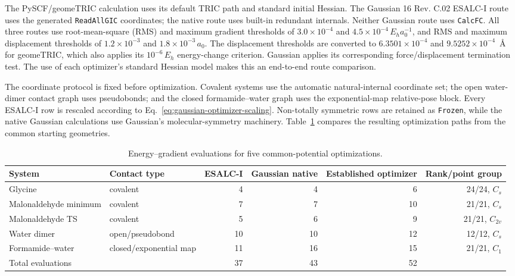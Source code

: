 \documentclass[10pt]{article}
\begin{document}
{The PySCF/geomeTRIC calculation uses its default TRIC path and standard initial
Hessian.  The Gaussian 16 Rev. C.02 ESALC-I route uses the generated
\texttt{ReadAllGIC} coordinates; the native route uses built-in redundant internals.  Neither Gaussian route uses
\texttt{CalcFC}.  All three routes use root-mean-square (RMS) and maximum gradient thresholds of
\(3.0\times10^{-4}\) and \(4.5\times10^{-4}\,E_h a_0^{-1}\), and RMS and
maximum displacement thresholds of \(1.2\times10^{-3}\) and
\(1.8\times10^{-3}\,a_0\).  The displacement thresholds are converted to
\(6.3501\times10^{-4}\) and \(9.5252\times10^{-4}\)~\AA{} for geomeTRIC,
which also applies its \(10^{-6}\,E_h\) energy-change criterion.  Gaussian
applies its corresponding force/displacement termination test.  The use of
each optimizer's standard Hessian model makes this an end-to-end route
comparison.

The coordinate protocol is fixed before optimization.  Covalent systems use
the automatic natural-internal {coordinate set}; the open water-dimer contact graph uses
pseudobonds; and the closed formamide--water graph uses the exponential-map
relative-pose block.  Every ESALC-I row is rescaled according to
Eq.~\ref{eq:gaussian-optimizer-scaling}.  Non-totally symmetric rows are retained
as \texttt{Frozen}, while the native Gaussian calculations use Gaussian's
molecular-symmetry machinery.
{Table~\ref{tab:pyscf-cross-optimizer} compares the resulting
optimization paths from the common starting geometries.}

\begin{table}[htbp]
\centering
\scriptsize
\setlength{\tabcolsep}{3.5pt}
\caption{Energy--gradient evaluations for five common-potential optimizations.}
\label{tab:pyscf-cross-optimizer}
\begin{tabularx}{\linewidth}{@{}lXrrrr@{}}
\toprule
System & Contact type & ESALC-I & Gaussian native & Established optimizer & Rank/point group \\
\midrule
Glycine & covalent & 4 & 4 & 6 & 24/24, \(C_s\) \\
Malonaldehyde minimum & covalent & 7 & 7 & 10 & 21/21, \(C_s\) \\
Malonaldehyde TS & covalent & 5 & 6 & 9 & 21/21, \(C_{2v}\) \\
Water dimer & open/pseudobond & 10 & 10 & 12 & 12/12, \(C_s\) \\
Formamide--water & closed/exponential map & 11 & 16 & 15 & 21/21, \(C_1\) \\
\midrule
Total evaluations & & 37 & 43 & 52 & \\
\bottomrule
\end{tabularx}
\end{table}

}
\end{document}
